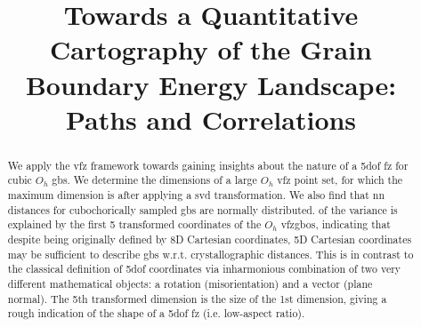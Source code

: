 \documentclass[final,twocolumn,12pt]{elsarticle}
\begin{document}
	
	\sloppy %
	
	\begin{frontmatter}
		
        \title{Towards a Quantitative Cartography of the Grain Boundary Energy Landscape: Paths and Correlations}
		
		
		
		\begin{abstract}
			We apply the \gls{vfz} framework towards gaining insights about the nature of a \gls{5dof} \gls{fz} for cubic $O_h$ \glspl{gb}. %
			We determine the dimensions of a large $O_h$ \gls{vfz} point set, for which the maximum dimension is \dimOne{} after applying a \gls{svd} transformation. We also find that \gls{nn} distances for cubochorically sampled \glspl{gb} are normally distributed. \percExplained{} of the variance is explained by the first 5 transformed coordinates of the $O_h$ \glspl{vfzgbo}, indicating that despite being originally defined by 8D Cartesian coordinates, 5D Cartesian coordinates may be sufficient to describe \glspl{gb} w.r.t. crystallographic distances. This is in contrast to the classical definition of \gls{5dof} coordinates via inharmonious combination of two very different mathematical objects: a rotation (misorientation) and a vector (plane normal). The 5th transformed dimension is \percFiveVsOne{} the size of the 1st dimension, giving a rough indication of the shape of a \gls{5dof} \gls{fz} (i.e. low-aspect ratio). %

\end{abstract}
\end{frontmatter}
\end{document}

